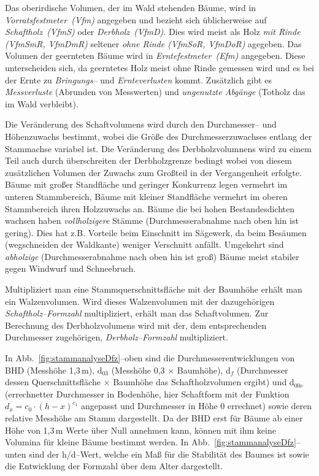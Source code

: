 \documentclass[twocolumn]{scrartcl}
\begin{document}
Das oberirdische Volumen, der im Wald stehenden Bäume, wird in
\emph{Vorratsfestmeter~(Vfm)}
angegeben und bezieht sich üblicherweise auf \emph{Schaftholz~(VfmS)} oder
\emph{Derbholz~(VfmD)}. Dies wird meist als Holz \emph{mit Rinde (VfmSmR,
VfmDmR)} seltener \emph{ohne Rinde (VfmSoR, VfmDoR)} agegeben. Das Volumen der
geernteten Bäume wird in
\emph{Erntefestmeter~(Efm)}
angegeben. Diese unterscheiden sich, da geerntetes Holz meist ohne Rinde
gemessen wird und es bei der Ernte zu \emph{Bringungs--} und
\emph{Ernteverlusten} kommt. Zusätzlich gibt es
\emph{Messverluste} (Abrunden von Messwerten) und \emph{ungenutzte Abgänge}
(Totholz das im Wald verbleibt).

Die Veränderung des Schaftvolumens wird durch den Durchmesser-- und Höhenzuwachs
bestimmt, wobei die Größe des Durchmesserzuwachses entlang der Stammachse
variabel ist. Die Veränderung des Derbholzvolumnens wird zu einem Teil auch
durch überschreiten der Derbholzgrenze bedingt wobei von diesem zusätzlichen
Volumen der Zuwachs zum Großteil in der Vergangenheit erfolgte. Bäume mit großer
Standfläche und geringer Konkurrenz legen vermehrt im unteren Stammbereich,
Bäume mit kleiner Standfläche vermehrt im oberen Stammbereich ihren Holzzuwachs
an. Bäume die bei hohen Bestandesdichten wachsen haben
\emph{vollholzigere} Stämme (Durchmesserabnahme nach oben hin
ist gering). Dies hat z.B. Vorteile beim Einschnitt im Sägewerk, da beim
Besäumen (wegschneiden der Waldkante) weniger Verschnitt anfällt. Umgekehrt sind
\emph{abholzige} (Durchmesserabnahme nach oben hin ist groß)
Bäume meist stabiler gegen Windwurf und Schneebruch.

Multipliziert man eine Stammquerschnittsfläche mit der Baumhöhe erhält man ein
Walzenvolumen. Wird dieses Walzenvolumen mit der dazugehörigen
\emph{Schaftholz--Formzahl} multipliziert, erhält
man das Schaftvolumen. Zur Berechnung des Derbholzvolumens wird mit der, dem
entsprechenden Durchmesser zugehörigen,
\emph{Derbholz--Formzahl} multipliziert.

In Abb.~\ref{fig:stammanalyseDfz}--oben sind die Durchmesserentwicklungen von
BHD (Messhöhe 1,3\,m), d$_{03}$ (Messhöhe 0,3 $\times$ Baumhöhe), d$_f$
(Durchmesser dessen Querschnittsfläche $\times$ Baumhöhe das Schaftholzvolumen
ergibt) und d$_{00e}$ (errechnetter Durchmesser in Bodenhöhe, hier Schaftform
mit der Funktion $d_x = c_0 \cdot (h - x)^{c_1}$ angepasst und Durchmesser in
Höhe 0 errechnet) sowie deren relative Messhöhe am Stamm dargestellt. Da der BHD
erst für Bäume ab einer Höhe von 1,3\,m Werte über Null annehmen kann, können
mit ihm keine Volumina für kleine Bäume bestimmt werden. In
Abb.~\ref{fig:stammanalyseDfz}--unten sind der h/d--Wert, welche ein Maß für die
Stabilität des Baumes ist sowie die Entwicklung der Formzahl über dem Alter
dargestellt.
\end{document}
